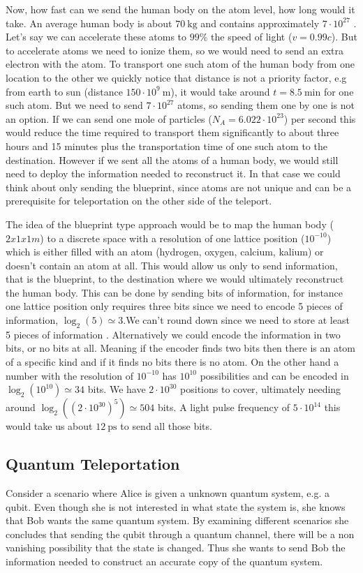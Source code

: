 \documentclass[a4paper]{article}
\begin{document}
Now, how fast can we send the human body on the atom level, how long would it
take. An average human body is about $70\ \text{kg}$ and contains
approximately $7\cdot 10^{27}$ \cite{body}.
Let's say we can accelerate these atoms to  $99\%$ the speed of light
($v=0.99c$). But to accelerate atoms we need to ionize them, so we would need
to send an extra electron with the atom.
To transport one such atom of the human body from one location to the other
we quickly notice that distance is not a priority factor, e.g from earth to sun
(distance $150\cdot10^9\ \text{m}$), it would take around $t = 8.5\ \text{min}$
for one such atom. But we need to send $7\cdot 10^{27}$ atoms, so sending them
one by one is not an option. If we can send one mole of particles ($N_A = 6.022
\cdot 10^{23}$)  per second this would reduce the time required to transport
them significantly to about three hours and 15 minutes plus the transportation
time of one such atom to the destination. However if we sent all the atoms of a
human body, we would still need to deploy the information needed to reconstruct
it. In that case we could think about only sending the blueprint, since atoms
are not unique and can be a prerequisite for teleportation
on the other side of the teleport.

The idea of the blueprint type approach would be to map the human body
($2x1x1m$) to a discrete space with a resolution of one lattice position
($10^{-10}$) which is either filled with an atom (hydrogen, oxygen, calcium,
kalium) or doesn't contain an atom at all.  This would allow us only to send
information, that is the blueprint, to the destination where we would
ultimately reconstruct the human body. This can be done by sending bits of
information, for instance one lattice position only requires three bits since
we need to encode 5 pieces of information, $\log_2(5) \simeq 3$.We can't round
down since we need to store at least 5 pieces of information . Alternatively we
could encode the information in two bits, or no bits at all. Meaning if the
encoder finds two bits then there is an atom of a specific kind and if it finds
no bits there is no atom. On the other hand a number with the resolution of
$10^{-10}$ has $10^{10}$ possibilities and can be encoded in $\log_2(10^{10})
\simeq 34$ bits. We have $2\cdot10^{30}$ positions to cover, ultimately needing
around $\log_2((2\cdot10^{30})^5) \simeq 504$ bits. A light pulse frequency of
$5\cdot 10^{14}$ this would take us about $12\ \text{ps}$ to send all those
bits.

\subsection{Quantum Teleportation}
Consider a scenario where Alice is given a unknown quantum system, e.g. a qubit.
Even though she is not interested in what state the system is, she knows that
Bob wants the same quantum system. By examining different scenarios she
concludes that sending the qubit through a quantum channel, there will be a non
vanishing possibility that the state is changed. Thus she wants to send Bob the
information needed to construct an accurate copy of the quantum system.
\end{document}
